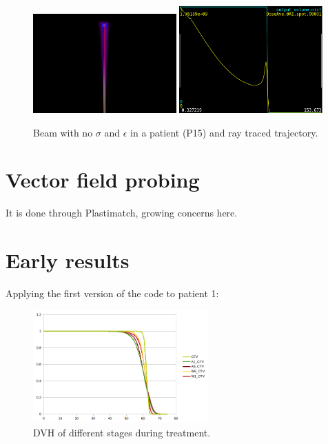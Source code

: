 \documentclass{article}
\begin{document}
\begin{figure}[h]
    \centering
    \includegraphics[width=0.49\textwidth]{beam.png}
    \includegraphics[width=0.49\textwidth]{profile.png}
    \caption{Beam with no $\sigma$ and $\epsilon$ in a patient (P15) and ray traced trajectory.}
\end{figure}

\section{Vector field probing}

It is done through Plastimatch, growing concerns here.

\section{Early results}

Applying the first version of the code to patient 1:

\begin{figure}[h]
    \centering
    \includegraphics[width=0.6\textwidth]{pat1_init_dvh.png}
    \caption{DVH of different stages during treatment.}
\end{figure}
\end{document}
